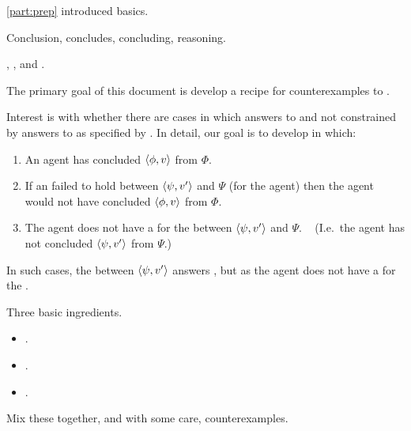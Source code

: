 \begin{note}

  \autoref{part:prep} introduced basics.
  \begin{TOCEnum}
  \item

    Conclusion, concludes, concluding, reasoning.
  \item
  \item

    \qWhyV{}, \qHowV{}, and \issueConstraint{}.
  \end{TOCEnum}

  The primary goal of this document is develop a recipe for counterexamples to \issueConstraint{}.

  Interest is with whether there are cases in which answers to \qWhyV{} and not constrained by answers to \qHowV{} as specified by \issueConstraint{}.
  In detail, our goal is to develop  in which:

  \begin{enumerate}
  \item
    An agent has concluded \(\langle \phi, v \rangle\) from \(\Phi\).
  \item
    If an \ros{} failed to hold between \(\langle \psi, v' \rangle\) and \(\Psi\) (for the agent) then the agent would not have concluded \(\langle \phi, v \rangle\) from \(\Phi\).
  \item
    The agent does not have a \wit{} for the \ros{} between \(\langle \psi, v' \rangle\) and \(\Psi\).%
    \mbox{ }\hfill%
    (I.e.\ the agent has not concluded \(\langle \psi, v' \rangle\) from \(\Psi\).)
  \end{enumerate}

  In such cases, the \ros{} between \(\langle \psi, v' \rangle\) answers \qWhyV{}, but as the agent does not have a \wit{} for the \ros{}.
\end{note}

\begin{note}
  Three basic ingredients.

  \begin{itemize}
  \item
    .
  \item
    .
  \item
    .
  \end{itemize}

  Mix these together, and with some care, counterexamples.
\end{note}


